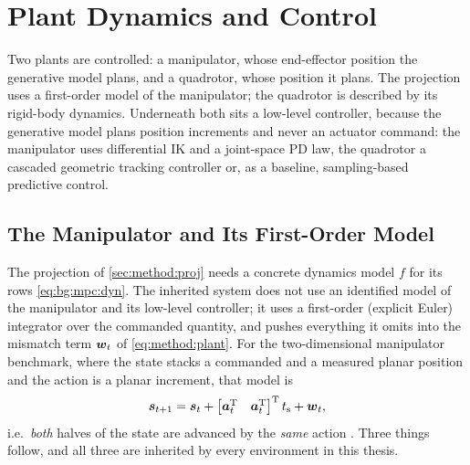 \section{Plant Dynamics and Control}\label{sec:method:dynamics}\label{sec:method:deployment}

Two plants are controlled: a manipulator, whose end-effector position the generative model plans, and
a quadrotor, whose position it plans. The projection uses a first-order model of the manipulator; the
quadrotor is described by its rigid-body dynamics. Underneath both sits a low-level controller, because
the generative model plans position increments and never an actuator command: the manipulator uses
differential \ac{IK} and a joint-space PD law, the quadrotor a cascaded geometric tracking controller
or, as a baseline, sampling-based predictive control.

\subsection{The Manipulator and Its First-Order Model}\label{sec:method:manipulator}

The projection of \autoref{sec:method:proj} needs a concrete dynamics model $f$ for its rows
\eqref{eq:bg:mpc:dyn}. The inherited system does not use an identified
model of the manipulator and its low-level controller; it uses a first-order (explicit Euler)
integrator over the commanded quantity, and pushes everything it omits into the mismatch term
$\boldsymbol{w}_{t}$ of \eqref{eq:method:plant}. For the two-dimensional manipulator benchmark, where the
state stacks a commanded and a measured planar position and the action is a planar increment, that
model is
\begin{equation}\label{eq:method:dpcc:euler}
  \boldsymbol{s}_{t+1}
  = \boldsymbol{s}_{t} + \begin{bmatrix}\boldsymbol{a}_{t}^{\textrm{T}} & \boldsymbol{a}_{t}^{\textrm{T}}\end{bmatrix}^{\textrm{T}} t_{\textrm{s}}
    + \boldsymbol{w}_{t},
\end{equation}
i.e.\ \emph{both} halves of the state are advanced by the \emph{same} action
\parencite[Sec.~6.1]{romer2025diffusion}. Three things follow, and all three are inherited by every
environment in this thesis.


